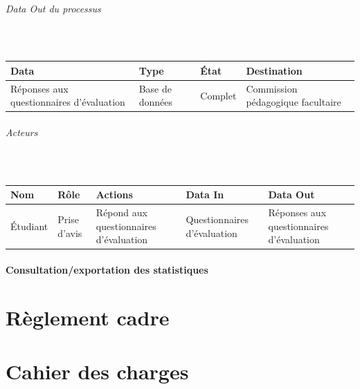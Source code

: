 \documentclass[a4paper,11pt]{report}
\begin{document}
\paragraph{Data Out du processus}~\newline{}

\begin{tabularx}{\linewidth}{|X|X|X|X|} \hline
Data & Type & État & Destination \\ \hline
Réponses aux questionnaires d'évaluation & Base de données & Complet & Commission pédagogique facultaire \\ \hline
\end{tabularx}

\paragraph{Acteurs}~\newline{}

\begin{tabularx}{\linewidth}{|X|X|X|X|X|} \hline
Nom & Rôle & Actions & Data In & Data Out \\ \hline 
Étudiant & Prise d'avis & Répond aux questionnaires d'évaluation & Questionnaires d'évaluation & Réponses aux questionnaires d'évaluation \\ \hline
\end{tabularx}




\subsection{Consultation/exportation des statistiques}


\appendix
\renewcommand{\partname}{Annexe}
\setcounter{part}{0}%
\part{Règlement cadre}\label{an:regl-cadre}


\part{Cahier des charges}

\end{document}
